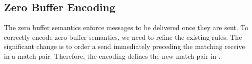 








\subsection{Zero Buffer Encoding}
The zero buffer semantics enforce messages to be delivered once they are sent. To correctly encode zero buffer semantics, we need to refine the existing rules. The significant change is to order a send immediately preceding the matching receive in a match pair. Therefore, the encoding defines the new match pair in . 

%
%

